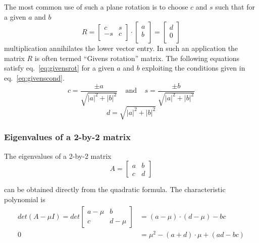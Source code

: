 The most common use of such a plane rotation is to choose $c$ and $s$
such that for a given $a$ and $b$
\begin{equation}
\label{eq:givensrot}
R =
\left[\begin{array}{rl}
c & s\\
-s & c\\
\end{array}\right]
\cdot
\begin{bmatrix}
a\\
b\\
\end{bmatrix}
=
\begin{bmatrix}
d\\
0\\
\end{bmatrix}
\end{equation}
multiplication annihilates the lower vector entry.  In such an
application the matrix $R$ is often termed ``Givens rotation'' matrix.
The following equations satisfy eq.~\eqref{eq:givensrot} for a given
$a$ and $b$ exploiting the conditions given in
eq.~\eqref{eq:givenscond}.
\begin{equation}
c = \dfrac{\pm a}{\sqrt{\left|a\right|^2 + \left|b\right|^2}}
\;\;\;\; \textrm{and} \;\;\;\;
s = \dfrac{\pm b}{\sqrt{\left|a\right|^2 + \left|b\right|^2}}
\end{equation}
\begin{equation}
d = \sqrt{\left|a\right|^2 + \left|b\right|^2}
\end{equation}

\subsubsection{Eigenvalues of a 2-by-2 matrix}

The eigenvalues of a 2-by-2 matrix
\begin{equation}
A = 
\begin{bmatrix}
a & b\\
c & d
\end{bmatrix}
\end{equation}

can be obtained directly from the quadratic formula.  The
characteristic polynomial is
\begin{equation}
\begin{split}
det\left(A -\mu I\right) =
det 
\begin{bmatrix}
a - \mu & b\\
c & d - \mu
\end{bmatrix}
&= \left(a -\mu\right) \cdot \left(d -\mu\right) - bc\\
0 &= \mu^2 - \left(a + d\right)\cdot\mu + \left(ad - bc\right)
\end{split}
\end{equation}

